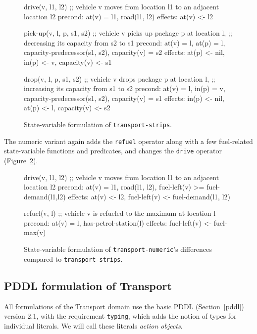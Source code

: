 \begin{figure}[tb]
\begin{code}
drive(v, l1, l2)
  ;; vehicle v moves from location l1 to an adjacent location l2
  precond: at(v) = l1, road(l1, l2)
  effects: at(v) <- l2

pick-up(v, l, p, s1, s2)
  ;; vehicle v picks up package p at location l,
  ;; decreasing its capacity from s2 to s1
  precond: at(v) = l, at(p) = l, capacity-predecessor(s1, s2),
           capacity(v) = s2
  effects: at(p) <- nil, in(p) <- v, capacity(v) <- s1
  
drop(v, l, p, s1, s2)
  ;; vehicle v drops package p at location l,
  ;; increasing its capacity from s1 to s2
  precond: at(v) = l, in(p) = v, capacity-predecessor(s1, s2),
           capacity(v) = s1
  effects: in(p) <- nil, at(p) <- l, capacity(v) <- s2
\end{code}
\caption{State-variable formulation of \texttt{transport-strips}.}
\label{code:statevar-strips}
\end{figure}

The numeric variant again adds the \verb+refuel+ operator along with
a few fuel-related state-variable functions and predicates, and changes 
the \verb+drive+ operator (Figure~\ref{code:statevar-numeric}).

\begin{figure}[tb]
\begin{code}
drive(v, l1, l2)
  ;; vehicle v moves from location l1 to an adjacent location l2
  precond: at(v) = l1, road(l1, l2), fuel-left(v) >= fuel-demand(l1,l2)
  effects: at(v) <- l2, fuel-left(v) <-  fuel-demand(l1, l2)
  
refuel(v, l)
  ;; vehicle v is refueled to the maximum at location l
  precond: at(v) = l, has-petrol-station(l)
  effects: fuel-left(v) <- fuel-max(v)
\end{code}
\caption{State-variable formulation of \texttt{transport-numeric}'s differences
compared to \texttt{transport-strips}.}
\label{code:statevar-numeric}
\end{figure}


\subsection{PDDL formulation of Transport}

All formulations of the Transport domain use the basic PDDL (Section~\ref{pddl}) version 2.1,
with the requirement \verb+typing+, which adds the notion of types for individual
literals. We will call these literals \textit{action objects}.

